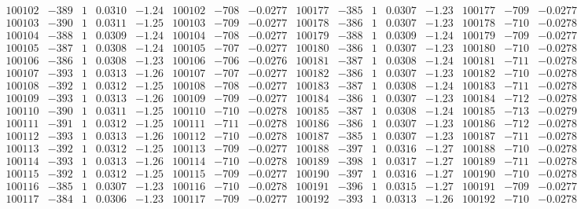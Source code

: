 \documentclass[11pt,reqno,a4letter]{article}
\numberwithin{figure}{section}
\numberwithin{table}{section}
\theoremstyle{plain}
\numberwithin{theorem}{section}
\theoremstyle{definition}
\begin{document}
\begin{table}[ht!]
\begin{equation*}
{\begin{array}{ccccc|ccc||ccccc|ccc}
100102 & -389 & 1 & 0.0310 & -1.24 & 100102 & -708 & -0.0277 & 100177 & -385 & 1 & 0.0307 & -1.23 & 100177 & -709 & -0.0277  \\
100103 & -390 & 1 & 0.0311 & -1.25 & 100103 & -709 & -0.0277 & 100178 & -386 & 1 & 0.0307 & -1.23 & 100178 & -710 & -0.0278  \\
100104 & -388 & 1 & 0.0309 & -1.24 & 100104 & -708 & -0.0277 & 100179 & -388 & 1 & 0.0309 & -1.24 & 100179 & -709 & -0.0277  \\
100105 & -387 & 1 & 0.0308 & -1.24 & 100105 & -707 & -0.0277 & 100180 & -386 & 1 & 0.0307 & -1.23 & 100180 & -710 & -0.0278  \\
100106 & -386 & 1 & 0.0308 & -1.23 & 100106 & -706 & -0.0276 & 100181 & -387 & 1 & 0.0308 & -1.24 & 100181 & -711 & -0.0278  \\
100107 & -393 & 1 & 0.0313 & -1.26 & 100107 & -707 & -0.0277 & 100182 & -386 & 1 & 0.0307 & -1.23 & 100182 & -710 & -0.0278  \\
100108 & -392 & 1 & 0.0312 & -1.25 & 100108 & -708 & -0.0277 & 100183 & -387 & 1 & 0.0308 & -1.24 & 100183 & -711 & -0.0278  \\
100109 & -393 & 1 & 0.0313 & -1.26 & 100109 & -709 & -0.0277 & 100184 & -386 & 1 & 0.0307 & -1.23 & 100184 & -712 & -0.0278  \\
100110 & -390 & 1 & 0.0311 & -1.25 & 100110 & -710 & -0.0278 & 100185 & -387 & 1 & 0.0308 & -1.24 & 100185 & -713 & -0.0279  \\
100111 & -391 & 1 & 0.0312 & -1.25 & 100111 & -711 & -0.0278 & 100186 & -386 & 1 & 0.0307 & -1.23 & 100186 & -712 & -0.0278  \\
100112 & -393 & 1 & 0.0313 & -1.26 & 100112 & -710 & -0.0278 & 100187 & -385 & 1 & 0.0307 & -1.23 & 100187 & -711 & -0.0278  \\
100113 & -392 & 1 & 0.0312 & -1.25 & 100113 & -709 & -0.0277 & 100188 & -397 & 1 & 0.0316 & -1.27 & 100188 & -710 & -0.0278  \\
100114 & -393 & 1 & 0.0313 & -1.26 & 100114 & -710 & -0.0278 & 100189 & -398 & 1 & 0.0317 & -1.27 & 100189 & -711 & -0.0278  \\
100115 & -392 & 1 & 0.0312 & -1.25 & 100115 & -709 & -0.0277 & 100190 & -397 & 1 & 0.0316 & -1.27 & 100190 & -710 & -0.0278  \\
100116 & -385 & 1 & 0.0307 & -1.23 & 100116 & -710 & -0.0278 & 100191 & -396 & 1 & 0.0315 & -1.27 & 100191 & -709 & -0.0277  \\
100117 & -384 & 1 & 0.0306 & -1.23 & 100117 & -709 & -0.0277 & 100192 & -393 & 1 & 0.0313 & -1.26 & 100192 & -710 & -0.0278  \\

\end{array}}
\end{equation*}
\end{table}
\end{document}
